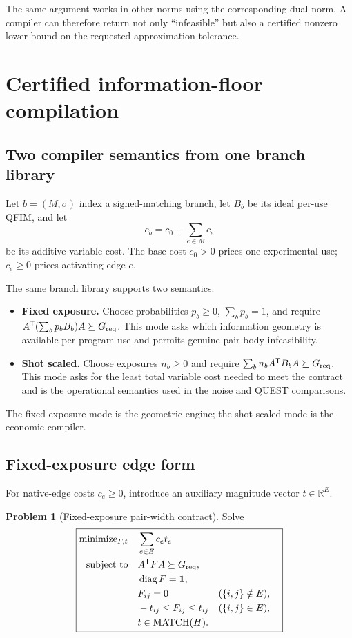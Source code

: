 \documentclass[11pt]{article}
\theoremstyle{definition}
\newtheorem{problem}[problem]{Problem}
\theoremstyle{remark}
\newcommand{\R}{\mathbb{R}}
\newcommand{\MATCH}{\operatorname{MATCH}}
\newcommand{\diag}{\operatorname{diag}}
\newcommand{\ones}{\mathbf{1}}
\begin{document}
The same argument works in other norms using the corresponding dual norm. A compiler can therefore return not only ``infeasible'' but also a certified nonzero lower bound on the requested approximation tolerance.

\section{Certified information-floor compilation}

\subsection{Two compiler semantics from one branch library}
Let $b=(M,\sigma)$ index a signed-matching branch, let $B_b$ be its ideal per-use QFIM, and let
\begin{equation}
  c_b=c_0+\sum_{e\in M}c_e
  \label{eq:branch-cost}
\end{equation}
be its additive variable cost. The base cost $c_0>0$ prices one experimental use; $c_e\ge0$ prices activating edge $e$.

The same branch library supports two semantics.
\begin{itemize}
  \item \textbf{Fixed exposure.} Choose probabilities $p_b\ge0$, $\sum_bp_b=1$, and require $A^{\mathsf T}(\sum_bp_bB_b)A\succeq G_{\rm req}$. This mode asks which information geometry is available per program use and permits genuine pair-body infeasibility.
  \item \textbf{Shot scaled.} Choose exposures $n_b\ge0$ and require $\sum_bn_bA^{\mathsf T}B_bA\succeq G_{\rm req}$. This mode asks for the least total variable cost needed to meet the contract and is the operational semantics used in the noise and QUEST comparisons.
\end{itemize}
The fixed-exposure mode is the geometric engine; the shot-scaled mode is the economic compiler.

\subsection{Fixed-exposure edge form}
For native-edge costs $c_e\ge0$, introduce an auxiliary magnitude vector $t\in\R^E$.
\begin{problem}[Fixed-exposure pair-width contract]
\label{prob:floor-ft}
Solve
\begin{equation}
\boxed{
\begin{aligned}
  \text{minimize}_{F,t}\quad & \sum_{e\in E}c_et_e\\
  \text{subject to}\quad & A^{\mathsf T}FA\succeq G_{\rm req},\\
  &\diag F=\ones,\\
  &F_{ij}=0 &&(\{i,j\}\notin E),\\
  &-t_{ij}\le F_{ij}\le t_{ij} &&(\{i,j\}\in E),\\
  &t\in\MATCH(H).
\end{aligned}}
\label{eq:floor-ft}
\end{equation}
\end{problem}
\end{document}
